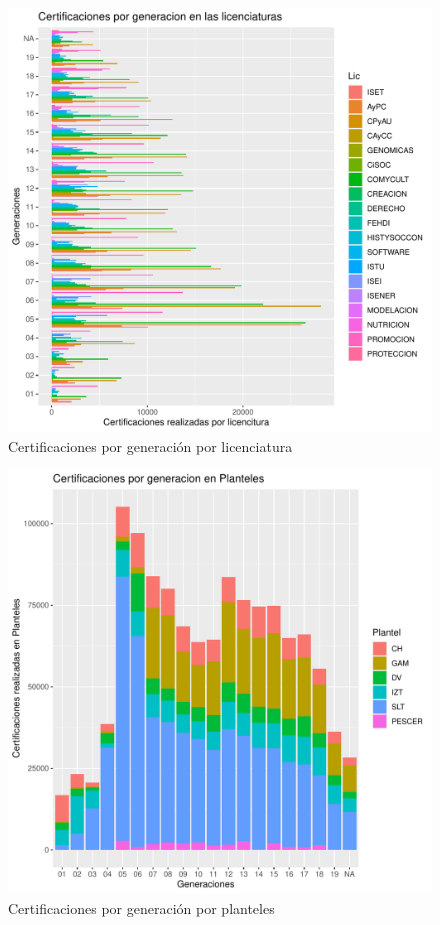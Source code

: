 \documentclass[12pt]{article}
\begin{document}
\begin{figure}
\centering
\includegraphics[scale=0.45]{Graficas/ggplotBarplotGenLic2.pdf}
\caption{Certificaciones por generaci\'on por licenciatura}
\label{Fig.Cert.Gen-Lic2}
\end{figure}

\begin{figure}
\centering
\includegraphics[scale=0.45]{Graficas/ggplotBarplotGenPlantel.pdf}
\caption{Certificaciones por generaci\'on por planteles}
\label{Fig.Cert.Gen-Plantel}
\end{figure}
\end{document}
